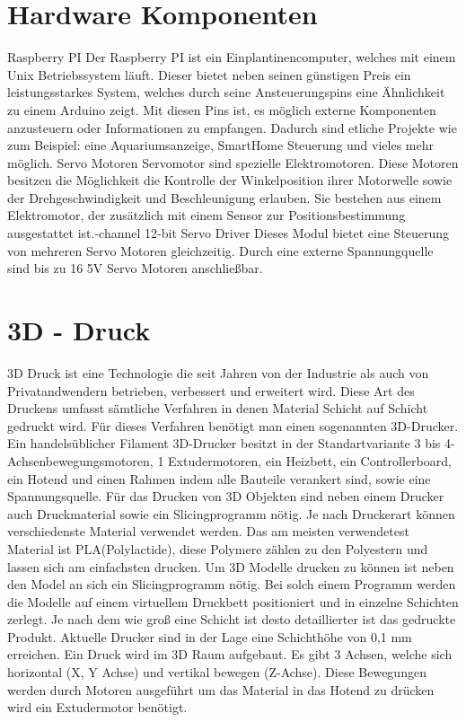 \documentclass[12pt,					%
							 oneside,			%
							 a4paper,			%
							 halfparskip,		%
							 liststotoc,			%
							 bibtotoc,			%
							 fleqn,				%
							 pointlessnumbers]	%
							 {scrreprt}
\begin{document}
\section{Hardware Komponenten}
Raspberry PI \newline
Der Raspberry PI  ist ein Einplantinencomputer, welches mit einem Unix Betriebssystem läuft. Dieser bietet neben seinen günstigen Preis ein leistungsstarkes System, welches durch seine Ansteuerungspins eine Ähnlichkeit zu einem Arduino zeigt. Mit diesen Pins ist, es möglich externe Komponenten anzusteuern oder Informationen zu empfangen. Dadurch sind etliche Projekte wie zum Beispiel: eine Aquariumsanzeige, SmartHome Steuerung und vieles mehr möglich.\newline\newline
Servo Motoren\newline
	Servomotor sind spezielle Elektromotoren. Diese Motoren besitzen die Möglichkeit die Kontrolle der Winkelposition ihrer Motorwelle sowie der Drehgeschwindigkeit und Beschleunigung erlauben. Sie bestehen aus einem Elektromotor, der zusätzlich mit einem Sensor zur Positionsbestimmung ausgestattet ist.\newline{}-channel 12-bit Servo Driver\newline
	Dieses Modul bietet eine Steuerung von mehreren Servo Motoren gleichzeitig. Durch eine externe Spannungquelle sind bis zu 16 5V Servo Motoren anschließbar.

\section{3D - Druck}
3D Druck ist eine Technologie die seit Jahren von der Industrie als auch von Privatandwendern betrieben, verbessert und erweitert wird. Diese Art des Druckens umfasst sämtliche Verfahren in denen Material Schicht auf Schicht gedruckt wird.
Für dieses Verfahren benötigt man einen sogenannten 3D-Drucker. Ein handelsüblicher Filament 3D-Drucker besitzt in der Standartvariante 3 bis 4-Achsenbewegungsmotoren, 1 Extudermotoren, ein Heizbett, ein Controllerboard, ein Hotend und einen Rahmen indem alle Bauteile verankert sind, sowie eine Spannungsquelle.
Für das Drucken von 3D Objekten sind neben einem Drucker auch Druckmaterial sowie ein Slicingprogramm nötig. Je nach Druckerart können verschiedenste Material verwendet werden. Das am meisten verwendetest Material ist PLA(Polylactide), diese Polymere zählen zu den Polyestern und lassen sich am einfachsten drucken.
Um 3D Modelle drucken zu können ist neben den Model an sich ein Slicingprogramm nötig. Bei solch einem Programm werden die Modelle auf einem virtuellem Druckbett positioniert und in einzelne Schichten zerlegt. Je nach dem wie groß eine Schicht ist desto detaillierter ist das gedruckte Produkt. Aktuelle Drucker sind in der Lage eine Schichthöhe von 0,1 mm erreichen.
Ein Druck wird im 3D Raum aufgebaut. Es gibt 3 Achsen, welche sich horizontal (X, Y Achse) und vertikal bewegen (Z-Achse). Diese Bewegungen werden durch Motoren ausgeführt um das Material in das Hotend zu drücken wird ein Extudermotor benötigt.
\end{document}
